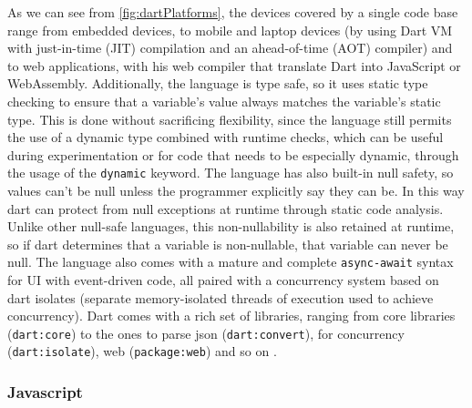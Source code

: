 \noindent As we can see from \cref{fig:dartPlatforms}, the devices covered by a single code base range from embedded devices, to mobile and laptop devices (by using Dart VM with just-in-time (JIT) compilation and an ahead-of-time (AOT) compiler) and to web applications, with his web compiler that translate Dart into JavaScript or WebAssembly. Additionally, the language is type safe, so it uses static type checking to ensure that a variable's value always matches the variable's static type. This is done without sacrificing flexibility, since the language still permits the use of a dynamic type combined with runtime checks, which can be useful during experimentation or for code that needs to be especially dynamic, through the usage of the \texttt{dynamic} keyword. The language has also built-in null safety, so values can't be null unless the programmer explicitly say they can be. In this way dart can protect from null exceptions at runtime through static code analysis. Unlike other null-safe languages, this non-nullability is also retained at runtime, so if dart determines that a variable is non-nullable, that variable can never be null. The language also comes with a mature and complete \texttt{async-await} syntax for UI with event-driven code, all paired with a concurrency system based on dart isolates (separate memory-isolated threads of execution used to achieve concurrency). Dart comes with a rich set of libraries, ranging from core libraries (\texttt{dart:core}) to the ones to parse json (\texttt{dart:convert}), for concurrency (\texttt{dart:isolate}), web (\texttt{package:web}) and so on \cite{Dart}.

\subsubsection{Javascript}

